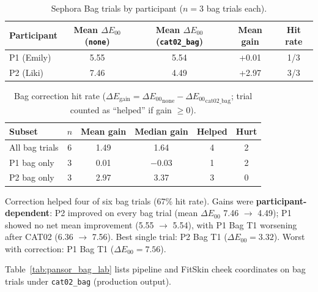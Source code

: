 \documentclass[11pt]{article}
\newcommand{\deee}{\ensuremath{\Delta E_{00}}}
\begin{document}
\begin{table}[htbp]
\centering
\caption{Sephora Bag trials by participant ($n=3$ bag trials each).}
\label{tab:pansor_bag_by_participant}
\begin{tabular}{l S[table-format=1.2] S[table-format=1.2] S[table-format=+-1.2] c}
\toprule
{Participant} & {Mean $\deee$ (\texttt{none})} & {Mean $\deee$ (\texttt{cat02\_bag})} & {Mean gain} & {Hit rate} \\
\midrule
P1 (Emily) & 5.55 & 5.54 & +0.01 & 1/3 \\
P2 (Liki)  & 7.46 & 4.49 & +2.97 & 3/3 \\
\bottomrule
\end{tabular}
\end{table}

\begin{table}[htbp]
\centering
\caption{Bag correction hit rate ($\Delta E_{\mathrm{gain}} = \deee_{\mathrm{none}} - \deee_{\mathrm{cat02\_bag}}$; trial counted as ``helped'' if gain $\ge 0$).}
\label{tab:pansor_hit_rate}
\begin{tabular}{l S[table-format=1.0] S[table-format=1.2] S[table-format=1.2] c c}
\toprule
{Subset} & {$n$} & {Mean gain} & {Median gain} & {Helped} & {Hurt} \\
\midrule
All bag trials & 6 & 1.49 & 1.64 & 4 & 2 \\
P1 bag only    & 3 & 0.01 & $-$0.03 & 1 & 2 \\
P2 bag only    & 3 & 2.97 & 3.37 & 3 & 0 \\
\bottomrule
\end{tabular}
\end{table}

Correction helped four of six bag trials (67\% hit rate). Gains were \textbf{participant-dependent}: P2 improved on every bag trial (mean $\deee$ 7.46 $\rightarrow$ 4.49); P1 showed no net mean improvement (5.55 $\rightarrow$ 5.54), with P1 Bag T1 worsening after CAT02 (6.36 $\rightarrow$ 7.56). Best single trial: P2 Bag T1 ($\deee=3.32$). Worst with correction: P1 Bag T1 ($\deee=7.56$).

Table~\ref{tab:pansor_bag_lab} lists pipeline and FitSkin cheek coordinates on bag trials under \texttt{cat02\_bag} (production output).
\end{document}
